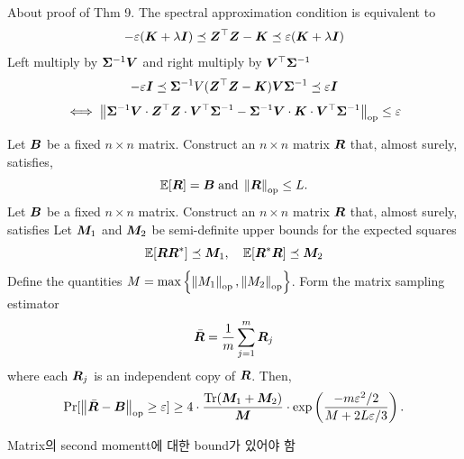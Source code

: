 \documentclass[9pt,t,aspectratio=169]{beamer}
\begin{document}
\begin{frame}{About proof of Thm 9.}
The spectral approximation condition is equivalent to 
\begin{equation*}
    -\varepsilon({\bm{K}} + \lambda {\bm{I}}) \preceq {\bm{Z}}^{\top}{\bm{Z}} - {\bm{K}} \preceq \varepsilon ({\bm{K}} + \lambda {\bm{I}}) 
\end{equation*}
Left multiply by ${\bm{\Sigma}}^{-1} {\bm{V}}$ and right multiply by ${\bm{V}}^{\top}{\bm{\Sigma}}^{-1}$ 
\begin{equation*}
    -\varepsilon {\bm{I}} \preceq {\bm{\Sigma}}^{-1}V({\bm{Z}}^{\top}{\bm{Z}} - {\bm{K}}) {\bm{V}} {\bm{\Sigma}}^{-1} \preceq \varepsilon {\bm{I}} 
\end{equation*}
\begin{equation*}
\iff \left\lVert{\bm{\Sigma}}^{-1} {\bm{V}} \cdot {\bm{Z}}^{\top} {\bm{Z}} \cdot {\bm{V}}^{\top} {\bm{\Sigma}}^{-1} - {\bm{\Sigma}}^{-1} {\bm{V}} \cdot {\bm{K}} \cdot {\bm{V}}^{\top} {\bm{\Sigma}}^{-1}\right\rVert_{\text{op}} \leq \varepsilon
\end{equation*}
\end{frame}
\begin{frame}
\begin{lemma}
Let ${\bm{B}}$ be a fixed $n \times n$ matrix. Construct an $n \times n$ matrix ${\bm{R}}$ that, almost surely, satisfies, 
\begin{equation*}
    \mathop{\mathbb{E} \displaystyle} [{\bm{R}}]= {\bm{B}} \text{\;and\;} \left\lVert{\bm{R}}\right\rVert_{\text{op}} \leq L. 
\end{equation*}
Let ${\bm{B}}$ be a fixed $n \times n$ matrix. Construct an $n \times n$ matrix ${\bm{R}}$ that, almost surely, satisfies 
Let ${\bm{M}}_1$ and ${\bm{M}}_2$ be semi-definite upper bounds for the expected squares 
\begin{equation*}
    \mathop{\mathbb{E} \displaystyle} [{\bm{R}} {\bm{R}}^*] \preceq {\bm{M}}_1, \quad  \mathop{\mathbb{E} \displaystyle} [{\bm{R}}^* {\bm{R}}] \preceq {\bm{M}}_2
\end{equation*}
Define the quantities $M = \max \left\{ \left\lVert M_1\right\rVert_{\text{op}}, \left\lVert M_2\right\rVert_{\text{op}} \right\}$. Form the matrix sampling estimator 
\begin{equation*}
    \bar{{\bm{R}}} = \frac{1}{m}\sum_{j=1}^m {\bm{R}}_j 
\end{equation*}
where each ${\bm{R}}_j$ is an independent copy of ${\bm{R}}$. Then, 
\begin{equation*}
    \Pr [ \left\lVert\bar{{\bm{R}}} - {\bm{B}}\right\rVert_{\text{op}} \geq \varepsilon] \geq 4 \cdot \frac{\operatorname{Tr}({\bm{M}}_1 + {\bm{M}}_2)}{{\bm{M}}} \cdot \exp \left( \frac{ -m \varepsilon^2 /2}{M + 2 L \varepsilon /3} \right). 
\end{equation*}
\end{lemma}
Matrix의 second momentt에 대한 bound가 있어야 함 
\end{frame}
\end{document}

